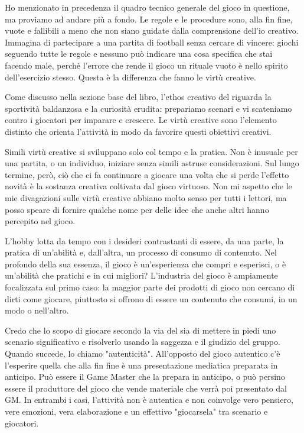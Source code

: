 
Ho menzionato in precedenza il quadro tecnico generale del gioco in questione, ma proviamo ad andare più a fondo. Le regole e le procedure sono, alla fin fine, vuote e fallibili a meno che non siano guidate dalla comprensione dell'io creativo. Immagina di partecipare a una partita di football senza cercare di vincere: giochi seguendo tutte le regole e nessuno può indicare una cosa specifica che stai facendo male, perché l'errore che rende il gioco un rituale vuoto è nello spirito dell'esercizio stesso. Questa è la differenza che fanno le virtù creative.

Come discusso nella sezione base del libro, l'ethos creativo del  riguarda la sportività baldanzosa e la curiosità erudita: prepariamo scenari e vi scateniamo contro i giocatori per imparare e crescere. Le virtù creative sono l'elemento distinto che orienta l'attività in modo da favorire questi obiettivi creativi.

Simili virtù creative si sviluppano solo col tempo e la pratica. Non è inusuale per una partita, o un individuo, iniziare senza simili astruse considerazioni. Sul lungo termine, però, ciò che ci fa continuare a giocare una volta che si perde l'effetto novità è la sostanza creativa coltivata dal gioco virtuoso. Non mi aspetto che le mie divagazioni sulle virtù creative abbiano molto senso per tutti i lettori, ma posso speare di fornire qualche nome per delle idee che anche altri hanno percepito nel gioco.


L'hobby lotta da tempo con i desideri contrastanti di essere, da una parte, la pratica di un'abilità e, dall'altra, un processo di consumo di contenuto. Nel profondo della sua essenza, il gioco è un'esperienza che compri e esperisci, o è un'abilità che pratichi e in cui migliori? L'industria del gioco è ampiamente focalizzata sul primo caso: la maggior parte dei prodotti di gioco non cercano di dirti come giocare, piuttosto si offrono di essere un contenuto che consumi, in un modo o nell'altro.

Credo che lo scopo di giocare secondo la via del  sia di mettere in piedi uno scenario significativo e risolverlo usando la saggezza e il giudizio del gruppo. Quando succede, lo chiamo "autenticità". All'opposto del gioco autentico c'è l'esperire quella che alla fin fine è una presentazione mediatica preparata in anticipo. Può essere il Game Master che la prepara in anticipo, o può persino essere il produttore del gioco che vende materiale che verrà poi presentato dal GM. In entrambi i casi, l'attività non è autentica e non coinvolge vero pensiero, vere emozioni, vera elaborazione e un effettivo "giocarsela" tra scenario e giocatori.

